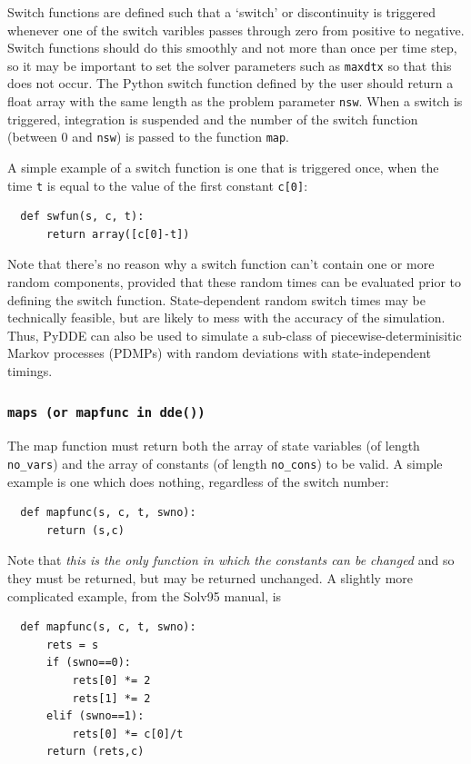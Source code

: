 \documentclass[10pt,a4paper] {article}
\begin{document}
Switch functions are defined such that a `switch' or discontinuity is triggered whenever one of the switch varibles passes through zero from positive to negative.  Switch functions should do this smoothly and not more than once per time step, so it may be important to set the solver parameters such as \verb+maxdtx+ so that this does not occur.  The Python switch function defined by the user should return a float array with the same length as the problem parameter \verb+nsw+.  When a switch is triggered, integration is suspended and the number of the switch function (between $0$ and \verb+nsw+) is passed to the function \verb+map+.

A simple example of a switch function is one that is triggered once, when the time \verb+t+ is equal to the value of the first constant \verb+c[0]+:
\begin{verbatim}
  def swfun(s, c, t):
      return array([c[0]-t])
\end{verbatim}

Note that there's no reason why a switch function can't contain one or more random components, provided that these random times can be evaluated prior to defining the switch function.  State-dependent random switch times may be technically feasible, but are likely to mess with the accuracy of the simulation.  Thus, PyDDE can also be used to simulate a sub-class of piecewise-determinisitic Markov processes (PDMPs) with random deviations with state-independent timings.

\subsubsection{\tt{maps} \textrm{(or} {\tt mapfunc}\textrm{ in} {\tt dde()}\textrm{)}}

The map function must return both the array of state variables (of length \verb+no_vars+) and the array of constants (of length \verb+no_cons+) to be valid.  A simple example is one which does nothing, regardless of the switch number:
\begin{verbatim}
  def mapfunc(s, c, t, swno):
      return (s,c)
\end{verbatim}
Note that \emph{this is the only function in which the constants can be changed} and so they must be returned, but may be returned unchanged.  A slightly more complicated example, from the Solv95 manual, is
\begin{verbatim}
  def mapfunc(s, c, t, swno):
      rets = s
      if (swno==0):
          rets[0] *= 2
          rets[1] *= 2 
      elif (swno==1):
          rets[0] *= c[0]/t
      return (rets,c)
\end{verbatim}
\end{document}
